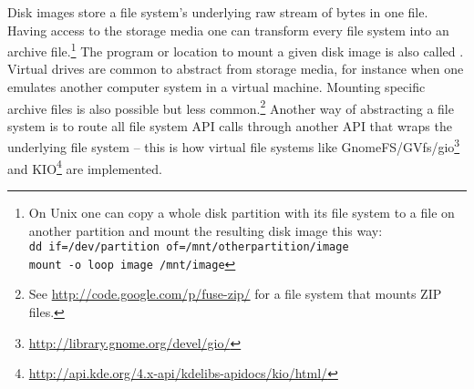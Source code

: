 Disk images store a file system's underlying raw stream of bytes in one file.
Having access to the storage media one can transform every file system into
an archive file.\footnote{On Unix one can copy a
whole disk partition with its file system to a file on another partition and
mount the resulting disk image this way:\\
\texttt{dd if=/dev/partition of=/mnt/otherpartition/image}\\
\texttt{mount -o loop image /mnt/image}
}
The program or location to mount a given disk image is also called
. Virtual drives are common to abstract from storage
media, for instance when one emulates another computer system in a virtual
machine. Mounting specific archive files is also possible but less
common.\footnote{See \url{http://code.google.com/p/fuse-zip/} for a
file system that mounts ZIP files.} Another way of abstracting a file system
is to route all file system API calls through another API that wraps the
underlying file system -- this is how virtual file systems like 
GnomeFS/GVfs/gio\footnote{\url{http://library.gnome.org/devel/gio/}}
and KIO\footnote{\url{http://api.kde.org/4.x-api/kdelibs-apidocs/kio/html/}}
are implemented. %


